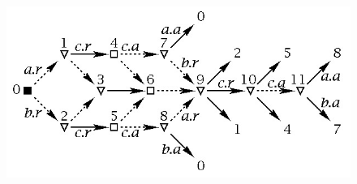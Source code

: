 \documentclass[12pt, a4paper, notitlepage]{article}
\begin{document}
\newpage
\thispagestyle{empty}
\begin{figure}[!htb]

	\begin{minipage}{\linewidth}
	\includegraphics[scale=0.85]{mixer.jpg}
	\end{minipage}

	\vspace{5mm}


\end{figure}
\end{document}
